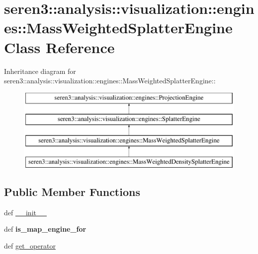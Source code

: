 \hypertarget{classseren3_1_1analysis_1_1visualization_1_1engines_1_1MassWeightedSplatterEngine}{
\section{seren3::analysis::visualization::engines::MassWeightedSplatterEngine Class Reference}
\label{classseren3_1_1analysis_1_1visualization_1_1engines_1_1MassWeightedSplatterEngine}
}
Inheritance diagram for seren3::analysis::visualization::engines::MassWeightedSplatterEngine::\begin{figure}[H]
\begin{center}
\leavevmode
\includegraphics[height=4cm]{classseren3_1_1analysis_1_1visualization_1_1engines_1_1MassWeightedSplatterEngine}
\end{center}
\end{figure}
\subsection*{Public Member Functions}
\begin{DoxyCompactItemize}
\item 
def \hyperlink{classseren3_1_1analysis_1_1visualization_1_1engines_1_1MassWeightedSplatterEngine_ac4d8bdd7049a6d50e5316fbb7777ad0a}{\_\-\_\-init\_\-\_\-}
\item 
\hypertarget{classseren3_1_1analysis_1_1visualization_1_1engines_1_1MassWeightedSplatterEngine_a7febb588c7f2fae75fbf51d8a7596210}{
def {\bfseries is\_\-map\_\-engine\_\-for}}
\label{classseren3_1_1analysis_1_1visualization_1_1engines_1_1MassWeightedSplatterEngine_a7febb588c7f2fae75fbf51d8a7596210}

\item 
def \hyperlink{classseren3_1_1analysis_1_1visualization_1_1engines_1_1MassWeightedSplatterEngine_ac29562a7446004938fbae70a684847c5}{get\_\-operator}
\end{DoxyCompactItemize}


